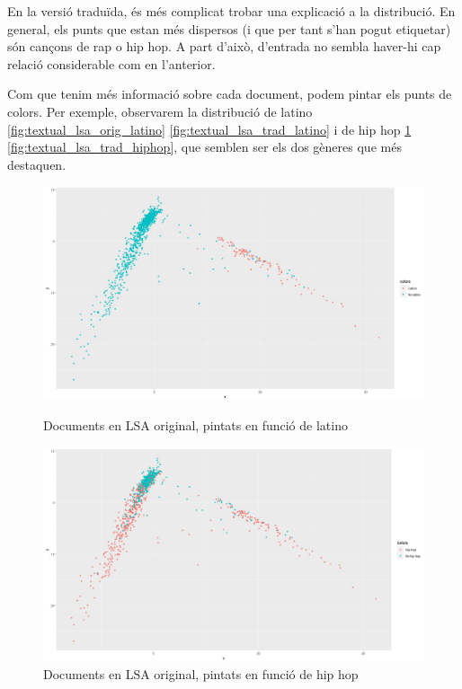 En la versió traduïda, és més complicat trobar una explicació a la distribució. En general, els punts que estan més dispersos (i que per tant s'han pogut etiquetar) són cançons de rap o hip hop. A part d'això, d'entrada no sembla haver-hi cap relació considerable com en l'anterior.

Com que tenim més informació sobre cada document, podem pintar els punts de colors. Per exemple, observarem la distribució de latino \ref{fig:textual_lsa_orig_latino} \ref{fig:textual_lsa_trad_latino} i de hip hop \ref{fig:textual_lsa_orig_hiphop} \ref{fig:textual_lsa_trad_hiphop}, que semblen ser els dos gèneres que més destaquen.


\begin{figure}[H]
\centering
    \begin{minipage}{.5\textwidth}
        \centering
        \includegraphics[width=0.95\linewidth]{Images//8_Textual//LSA/original_distances_latino.png}
    \caption{Documents en LSA original, pintats en funció de latino}
    \label{fig:textual_lsa_orig_latino}
    \end{minipage}%
    \begin{minipage}{.5\textwidth}
        \centering
        \includegraphics[width=0.95\linewidth]{Images//8_Textual//LSA/original_distances_hip_hop.png}
    \caption{Documents en LSA original, pintats en funció de hip hop}
    \label{fig:textual_lsa_orig_hiphop}
    \end{minipage}%
\end{figure}


